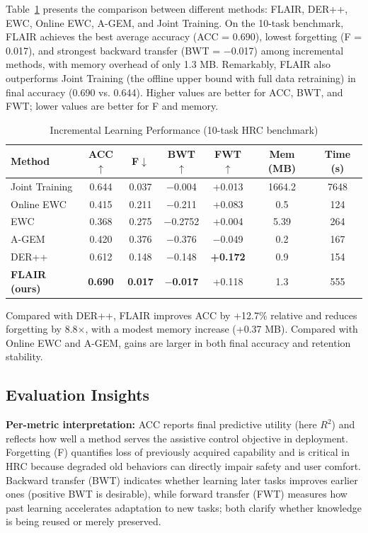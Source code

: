\documentclass[3p,times,procedia]{elsarticle}
\begin{document}
Table~\ref{tab:results} presents the comparison between different methods: FLAIR, DER++, EWC, Online EWC, A-GEM, and Joint Training. On the 10-task benchmark, FLAIR achieves the best average accuracy (ACC = 0.690), lowest forgetting (F = 0.017), and strongest backward transfer (BWT = $-$0.017) among incremental methods, with memory overhead of only 1.3 MB. Remarkably, FLAIR also outperforms Joint Training (the offline upper bound with full data retraining) in final accuracy (0.690 vs. 0.644). Higher values are better for ACC, BWT, and FWT; lower values are better for F and memory.

\begin{table}[h!]
\caption{Incremental Learning Performance (10-task HRC benchmark)}
\label{tab:results}
\centering
\footnotesize
\setlength{\tabcolsep}{3pt}
\begin{tabular}{@{}lcccccc@{}}
\toprule
\textbf{Method} & \textbf{ACC}$\uparrow$ & \textbf{F}$\downarrow$ & \textbf{BWT}$\uparrow$ & \textbf{FWT}$\uparrow$ & \textbf{Mem (MB)} & \textbf{Time (s)} \\
\midrule
Joint Training & 0.644 & 0.037 & $-$0.004 & +0.013 & 1664.2 & 7648 \\
\midrule
Online EWC & 0.415 & 0.211 & $-$0.211 & +0.083 & 0.5 & 124 \\
EWC & 0.368 & 0.275 & $-$0.2752 & +0.004 & 5.39 & 264 \\
A-GEM & 0.420 & 0.376 & $-$0.376 & $-$0.049 & 0.2 & 167 \\
DER++ & 0.612 & 0.148 & $-$0.148 & \textbf{+0.172} & 0.9 & 154 \\
\textbf{FLAIR (ours)} & \textbf{0.690} & \textbf{0.017} & \textbf{$-$0.017} & +0.118 & 1.3 & 555 \\
\bottomrule
\end{tabular}
\end{table}

Compared with DER++, FLAIR improves ACC by +12.7\% relative and reduces forgetting by 8.8$\times$, with a modest memory increase (+0.37 MB). Compared with Online EWC and A-GEM, gains are larger in both final accuracy and retention stability.

\subsection{Evaluation Insights}
\label{sec:evaluation_insights}

\textbf{Per-metric interpretation:} ACC reports final predictive utility (here $R^2$) and reflects how well a method serves the assistive control objective in deployment. Forgetting (F) quantifies loss of previously acquired capability and is critical in HRC because degraded old behaviors can directly impair safety and user comfort. Backward transfer (BWT) indicates whether learning later tasks improves earlier ones (positive BWT is desirable), while forward transfer (FWT) measures how past learning accelerates adaptation to new tasks; both clarify whether knowledge is being reused or merely preserved.
\end{document}
